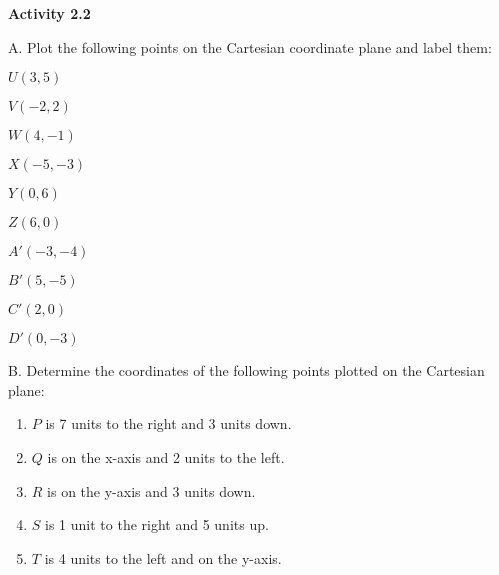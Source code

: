 \noindent\textbf{Activity 2.2}


A. Plot the following points on the Cartesian coordinate plane and label them:

\begin{enumerate}[label = \color{blue}\arabic*. ]
\begin{multicols}{3}
    \item \(U(3, 5)\)
    \item \(V(-2, 2)\)
    \item \(W(4, -1)\)
    \item \(X(-5, -3)\)
    \item \(Y(0, 6)\)
    \item \(Z(6, 0)\)
    \item \(A'(-3, -4)\)
    \item \(B'(5, -5)\)
    \item \(C'(2, 0)\)
    \item \(D'(0, -3)\)
\end{multicols}
\end{enumerate}

B. Determine the coordinates of the following points plotted on the Cartesian plane:

\begin{enumerate}[label = \color{blue}\arabic*. ]

    \item \(P\) is 7 units to the right and 3 units down.
    \item \(Q\) is on the x-axis and 2 units to the left.
    \item \(R\) is on the y-axis and 3 units down.
    \item \(S\) is 1 unit to the right and 5 units up.
    \item \(T\) is 4 units to the left and on the y-axis.
\end{enumerate}

				
				
 
